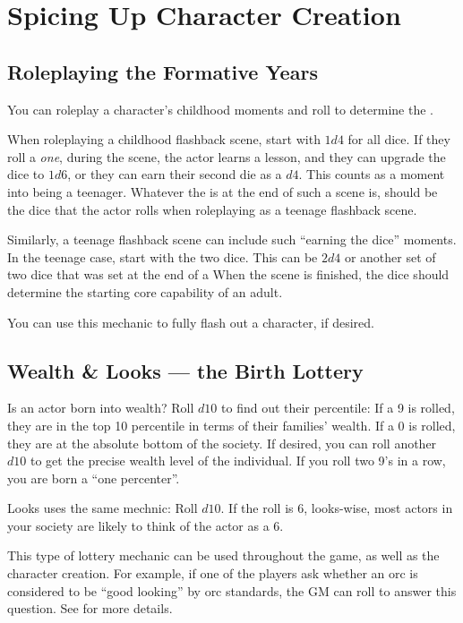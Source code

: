 \section{Spicing Up Character Creation}

\subsection{Roleplaying the Formative Years}

You can roleplay a character's childhood moments and roll to determine
the .

When roleplaying a childhood flashback scene, start with $1d4$ for all dice. If they roll a \emph{one},
during the scene, the actor learns a lesson, and they can upgrade the dice to $1d6$,
or they can earn their second die as a $d4$. This counts as a 
moment into being a teenager. Whatever the  is at the end of
such a scene is, should be the dice that the actor rolls when roleplaying as a teenage flashback scene.


Similarly, a teenage flashback scene can include such ``earning the dice'' moments.
In the teenage case, start with the two dice. This can be $2d4$ or another set of two
dice that was set at the end of a When the scene is finished, the dice should
determine the starting core capability of an adult.

You can use this mechanic to fully flash out a character, if desired.

\subsection{Wealth \& Looks --- the Birth Lottery}

Is an actor born into wealth? Roll $d10$ to find out their percentile:
If a 9 is rolled, they are in the top 10 percentile in terms of their families' wealth.
If a 0 is rolled, they are at the absolute bottom of the society.
If desired, you can roll another $d10$ to get the precise wealth level of the individual.
If you roll two 9's in a row, you are born a ``one percenter''.

Looks uses the same mechnic: Roll $d10$. If the roll is 6, looks-wise, most actors in
your society are likely to think of the actor as a 6.

This type of lottery mechanic can be used throughout the game, as well as the character creation.
For example, if one of the players ask whether an orc is considered to be ``good looking'' by orc standards,
the GM can roll to answer this question. See  for more details.


